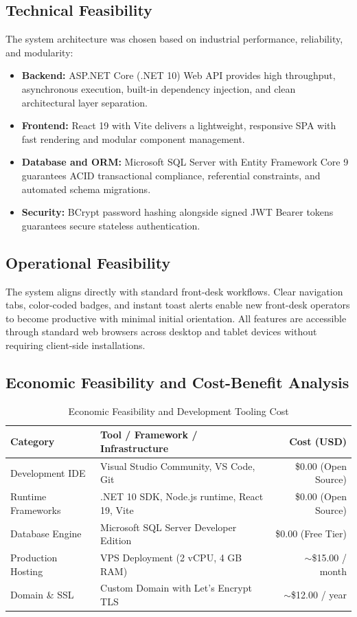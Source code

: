 \documentclass[11pt,a4paper]{article}
\begin{document}
\subsection{Technical Feasibility}
The system architecture was chosen based on industrial performance, reliability, and modularity:
\begin{itemize}[leftmargin=*]
  \item \textbf{Backend:} ASP.NET Core (.NET 10) Web API provides high throughput, asynchronous execution, built-in dependency injection, and clean architectural layer separation.
  \item \textbf{Frontend:} React 19 with Vite delivers a lightweight, responsive SPA with fast rendering and modular component management.
  \item \textbf{Database and ORM:} Microsoft SQL Server with Entity Framework Core 9 guarantees ACID transactional compliance, referential constraints, and automated schema migrations.
  \item \textbf{Security:} BCrypt password hashing alongside signed JWT Bearer tokens guarantees secure stateless authentication.
\end{itemize}

\subsection{Operational Feasibility}
The system aligns directly with standard front-desk workflows. Clear navigation tabs, color-coded badges, and instant toast alerts enable new front-desk operators to become productive with minimal initial orientation. All features are accessible through standard web browsers across desktop and tablet devices without requiring client-side installations.

\subsection{Economic Feasibility and Cost-Benefit Analysis}
\begin{table}[H]
\centering
\caption{Economic Feasibility and Development Tooling Cost}
\label{tab:economic_feasibility}
\begin{tabularx}{\textwidth}{l X r}
\toprule
\textbf{Category} & \textbf{Tool / Framework / Infrastructure} & \textbf{Cost (USD)} \\
\midrule
Development IDE & Visual Studio Community, VS Code, Git & \$0.00 (Open Source) \\
Runtime Frameworks & .NET 10 SDK, Node.js runtime, React 19, Vite & \$0.00 (Open Source) \\
Database Engine & Microsoft SQL Server Developer Edition & \$0.00 (Free Tier) \\
Production Hosting & VPS Deployment (2 vCPU, 4 GB RAM) & $\sim$\$15.00 / month \\
Domain \& SSL & Custom Domain with Let's Encrypt TLS & $\sim$\$12.00 / year \\
\bottomrule
\end{tabularx}
\end{table}
\end{document}
